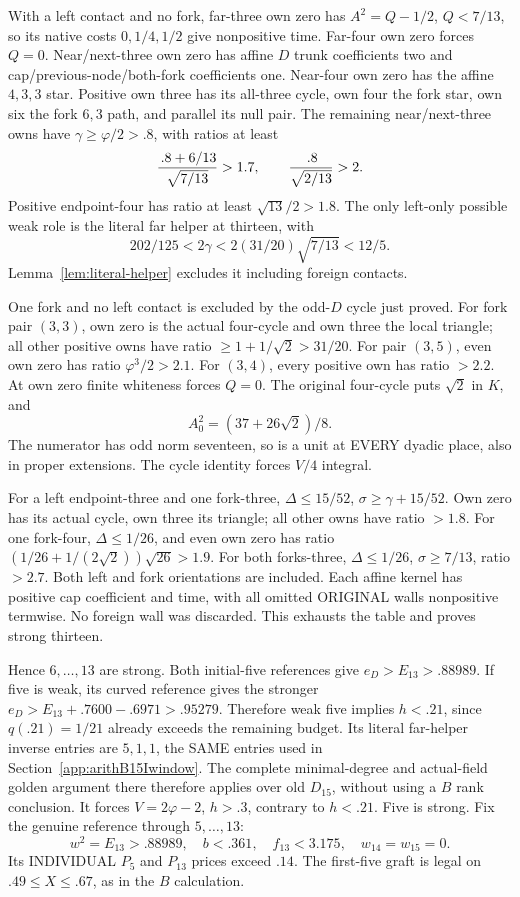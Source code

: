 \documentclass[11pt]{article}
\begin{document}
With a left contact and no fork, far-three own zero
has \(A^2=Q-1/2\), \(Q<7/13\), so its native
costs \(0,1/4,1/2\) give nonpositive time.
Far-four own zero forces \(Q=0\).
Near/next-three own zero has affine \(D\) trunk
coefficients two and cap/previous-node/both-fork
coefficients one.
Near-four own zero has the affine \(4,3,3\) star.
Positive own three has its all-three cycle,
own four the fork star, own six the fork \(6,3\)
path, and parallel its null pair.
The remaining near/next-three owns have
\(\gamma\ge\varphi/2>.8\), with ratios at least
\[
 {\, .8+6/13\over\sqrt{7/13}}>1.7,\qquad
 {\, .8\over\sqrt{2/13}}>2.
\]
Positive endpoint-four has ratio at least
\(\sqrt{13}/2>1.8\).
The only left-only possible weak role is the literal
far helper at thirteen, with
\[
       202/125<2\gamma<2(31/20)\sqrt{7/13}<12/5.
\]
Lemma~\ref{lem:literal-helper} excludes it including
foreign contacts.

One fork and no left contact is excluded by the
odd-\(D\) cycle just proved.
For fork pair \((3,3)\), own zero is the actual
four-cycle and own three the local triangle;
all other positive owns have ratio
\(\ge1+1/\sqrt2>31/20\).
For pair \((3,5)\), even own zero has ratio
\(\varphi^3/2>2.1\).
For \((3,4)\), every positive own has ratio \(>2.2\).
At own zero finite whiteness forces \(Q=0\).
The original four-cycle puts \(\sqrt2\) in \(K\),
and
\[
                      A_0^2=(37+26\sqrt2)/8 .
\]
The numerator has odd norm seventeen, so is a unit
at EVERY dyadic place, also in proper extensions.
The cycle identity forces \(V/4\) integral.

For a left endpoint-three and one fork-three,
\(\Delta\le15/52\), \(\sigma\ge\gamma+15/52\).
Own zero has its actual cycle, own three its triangle;
all other owns have ratio \(>1.8\).
For one fork-four,
\(\Delta\le1/26\), and even own zero has ratio
\((1/26+1/(2\sqrt2))\sqrt{26}>1.9\).
For both forks-three,
\(\Delta\le1/26\), \(\sigma\ge7/13\), ratio \(>2.7\).
Both left and fork orientations are included.
Each affine kernel has positive cap coefficient and
time, with all omitted ORIGINAL walls nonpositive
termwise.  No foreign wall was discarded.
This exhausts the table and proves strong thirteen.

Hence \(6,\ldots,13\) are strong.
Both initial-five references give \(e_D>E_{13}>.88989\).
If five is weak, its curved reference gives the stronger
\(e_D>E_{13}+.7600-.6971>.95279\).
Therefore weak five implies \(h<.21\), since
\(q(.21)=1/21\) already exceeds the remaining budget.
Its literal far-helper inverse entries are \(5,1,1\),
the SAME entries used in Section~\ref{app:arithB15Iwindow}.
The complete minimal-degree and actual-field golden
argument there therefore applies over old \(D_{15}\),
without using a \(B\) rank conclusion.
It forces \(V=2\varphi-2\), \(h>.3\), contrary to
\(h<.21\).
Five is strong.
Fix the genuine reference through \(5,\ldots,13\):
\[
 w^2=E_{13}>.88989,\quad
 b<.361,\quad f_{13}<3.175,\quad
 w_{14}=w_{15}=0.
\]
Its INDIVIDUAL \(P_5\) and \(P_{13}\) prices exceed
\(.14\).  The first-five graft is legal on
\(.49\le X\le.67\), as in the \(B\) calculation.
\end{document}
